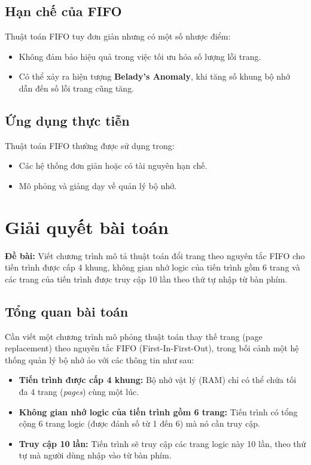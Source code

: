 \subsection{Hạn chế của FIFO}
Thuật toán FIFO tuy đơn giản nhưng có một số nhược điểm:
\begin{itemize}
    \item Không đảm bảo hiệu quả trong việc tối ưu hóa số lượng lỗi trang.
    \item Có thể xảy ra hiện tượng \textbf{Belady's Anomaly}, khi tăng số khung bộ nhớ dẫn đến số lỗi trang cũng tăng.
\end{itemize}

\subsection{Ứng dụng thực tiễn}
Thuật toán FIFO thường được sử dụng trong:
\begin{itemize}
    \item Các hệ thống đơn giản hoặc có tài nguyên hạn chế.
    \item Mô phỏng và giảng dạy về quản lý bộ nhớ.
\end{itemize}

\section{Giải quyết bài toán}

\textbf{Đề bài: }Viết chương trình mô tả thuật toán đổi trang theo nguyên tắc FIFO cho tiến trình được cấp 4 khung, không gian nhớ logic của tiến trình gồm 6 trang và các trang của tiến trình được truy cập 10 lần theo thứ tự nhập từ bàn phím.

\subsection{Tổng quan bài toán}
Cần viết một chương trình mô phỏng thuật toán thay thế trang (page replacement) theo nguyên tắc FIFO (First-In-First-Out), trong bối cảnh một hệ thống quản lý bộ nhớ ảo với các thông tin như sau:
\begin{itemize}
    \item \textbf{Tiến trình được cấp 4 khung:} Bộ nhớ vật lý (RAM) chỉ có thể chứa tối đa 4 trang (\textit{pages}) cùng một lúc.
    \item \textbf{Không gian nhớ logic của tiến trình gồm 6 trang:} Tiến trình có tổng cộng 6 trang logic (được đánh số từ 1 đến 6) mà nó cần truy cập.
    \item \textbf{Truy cập 10 lần:} Tiến trình sẽ truy cập các trang logic này 10 lần, theo thứ tự mà người dùng nhập vào từ bàn phím.
\end{itemize}

